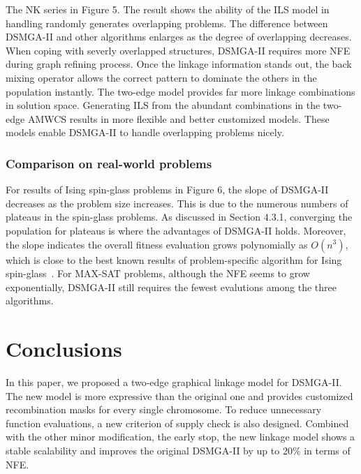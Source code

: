 \documentclass{sig-alternate-05-2015}
\begin{document}
The NK series in Figure 5.
The result shows the ability of the ILS model in handling randomly generates overlapping problems. 
The difference between DSMGA-II and other algorithms enlarges as the degree of overlapping decreases. 
When coping with severly overlapped structures, DSMGA-II requires more NFE during graph refining process.
Once the linkage information stands out, the back mixing operator allows the correct pattern to dominate the others in the population instantly. 
The two-edge model provides far more linkage combinations in solution space.
Generating ILS from the abundant combinations in the two-edge AMWCS results in more flexible and better customized models.
These models enable DSMGA-II to handle overlapping problems nicely. 


\subsubsection{ Comparison on real-world problems }



For results of Ising spin-glass problems in Figure 6, the slope of DSMGA-II decreases as the problem size increases. 
This is due to the numerous numbers of plateaus in the spin-glass problems.
As discussed in Section 4.3.1, converging the population for plateaus is where the advantages of DSMGA-II holds.
Moreover, the slope indicates the overall fitness evaluation grows polynomially as $O(n^3)$, which is close to the best known results of problem-specific algorithm for Ising spin-glass~\cite{galluccio:pfaffian}.
For MAX-SAT problems, although the NFE seems to grow exponentially, DSMGA-II still requires the fewest evalutions among the three algorithms.



\section{Conclusions}
 
In this paper, we proposed a two-edge graphical linkage model for DSMGA-II. 
The new model is more expressive than the original one and provides customized recombination masks for every single chromosome. 
To reduce unnecessary function evaluations, a new criterion of supply check  is also designed. Combined with the other minor modification, the early stop, the new linkage model shows a stable scalability and improves the original DSMGA-II by up to 20\% in terms of NFE.
\end{document}
